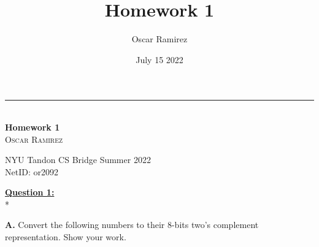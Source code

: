 \documentclass[12pt, letterpaper, twoside]{article}
\title{\textbf{Homework 1}}
\author{Oscar Ramirez}
\date{July 15 2022}
\begin{document}
\begin{titlepage}   

    \raggedleft %

    \rule{1pt}{\textheight} %
    \hspace{0.05\textwidth} %
    \parbox[b]{0.75\textwidth}{ %
        {\large\textit{}}\\[4\baselineskip]

        {\Huge\bfseries Homework 1}\\[2\baselineskip] %

        {\Large\textsc{Oscar Ramirez}} %

        \vspace{0.47\textheight} %
        {\noindent NYU Tandon CS Bridge Summer 2022}\\[0.1\baselineskip]
        {\noindent NetID: or2092}\\[\baselineskip]
    }

\end{titlepage}


\newpage
\noindent \underline{\textbf{Question 1:}}\\*

\noindent \textbf{A.} Convert the following numbers to their 8-bits two’s complement representation. Show your work.\\
\end{document}

